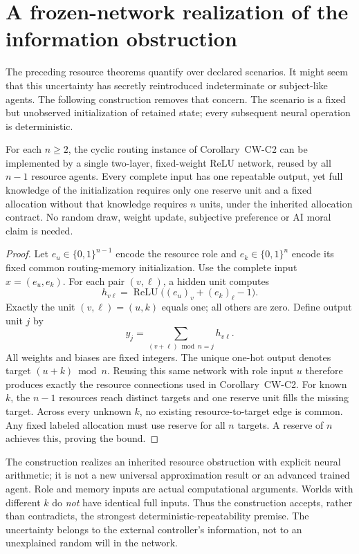 \section{A frozen-network realization of the information obstruction}
\label{sec:neural}
The preceding resource theorems quantify over declared scenarios. It might seem that this uncertainty has secretly reintroduced indeterminate or subject-like agents. The following construction removes that concern. The scenario is a fixed but unobserved initialization of retained state; every subsequent neural operation is deterministic.

\begin{theorem}
For each $n\geq2$, the cyclic routing instance of Corollary~CW-C2 can be implemented by a single two-layer, fixed-weight ReLU network, reused by all $n-1$ resource agents. Every complete input has one repeatable output, yet full knowledge of the initialization requires only one reserve unit and a fixed allocation without that knowledge requires $n$ units, under the inherited allocation contract. No random draw, weight update, subjective preference or AI moral claim is needed.
\end{theorem}
\begin{proof}
Let $e_u\in\{0,1\}^{n-1}$ encode the resource role and $e_k\in\{0,1\}^{n}$ encode its fixed common routing-memory initialization. Use the complete input $x=(e_u,e_k)$. For each pair $(v,\ell)$, a hidden unit computes
\[
h_{v\ell}=\operatorname{ReLU}\big((e_u)_v+(e_k)_\ell-1\big).
\]
Exactly the unit $(v,\ell)=(u,k)$ equals one; all others are zero. Define output unit $j$ by
\[
y_j=\sum_{(v+\ell)\bmod n=j}h_{v\ell}.
\]
All weights and biases are fixed integers. The unique one-hot output denotes target $(u+k)\bmod n$. Reusing this same network with role input $u$ therefore produces exactly the resource connections used in Corollary~CW-C2. For known $k$, the $n-1$ resources reach distinct targets and one reserve unit fills the missing target. Across every unknown $k$, no existing resource-to-target edge is common. Any fixed labeled allocation must use reserve for all $n$ targets. A reserve of $n$ achieves this, proving the bound.
\end{proof}
The construction realizes an inherited resource obstruction with explicit neural arithmetic; it is not a new universal approximation result or an advanced trained agent. Role and memory inputs are actual computational arguments. Worlds with different $k$ do \emph{not} have identical full inputs. Thus the construction accepts, rather than contradicts, the strongest deterministic-repeatability premise. The uncertainty belongs to the external controller's information, not to an unexplained random will in the network.

